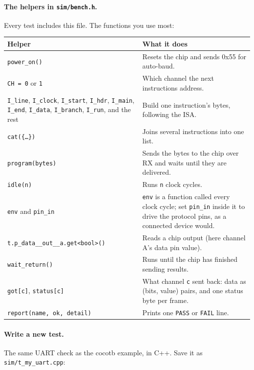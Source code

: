 \documentclass[11pt,a4paper]{article}
\newcommand{\file}[1]{\texttt{#1}}
\begin{document}
\paragraph{The helpers in \file{sim/bench.h}.} Every test includes this file. The functions you use most:

\begin{center}
\begin{tabularx}{\linewidth}{@{}>{\raggedright\arraybackslash}p{5.7cm}X@{}}
\toprule
Helper & What it does \\
\midrule
\texttt{power\_on()} & Resets the chip and sends 0x55 for auto-baud. \\
\texttt{CH = 0} or \texttt{1} & Which channel the next instructions address. \\
\texttt{I\_line}, \texttt{I\_clock}, \texttt{I\_start}, \texttt{I\_hdr}, \texttt{I\_main}, \texttt{I\_end}, \texttt{I\_data}, \texttt{I\_branch}, \texttt{I\_run}, and the rest & Build one instruction's bytes, following the ISA. \\
\texttt{cat(\{\ldots\})} & Joins several instructions into one list. \\
\texttt{program(bytes)} & Sends the bytes to the chip over RX and waits until they are delivered. \\
\texttt{idle(n)} & Runs \texttt{n} clock cycles. \\
\texttt{env} and \texttt{pin\_in} & \texttt{env} is a function called every clock cycle; set \texttt{pin\_in} inside it to drive the protocol pins, as a connected device would. \\
\texttt{t.p\_data\_\_out\_\_a.get<bool>()} & Reads a chip output (here channel A's data pin value). \\
\texttt{wait\_return()} & Runs until the chip has finished sending results. \\
\texttt{got[c]}, \texttt{status[c]} & What channel \texttt{c} sent back: data as (bits, value) pairs, and one status byte per frame. \\
\texttt{report(name, ok, detail)} & Prints one \texttt{PASS} or \texttt{FAIL} line. \\
\bottomrule
\end{tabularx}
\end{center}

\paragraph{Write a new test.} The same UART check as the cocotb example, in C++. Save it as \file{sim/t\_my\_uart.cpp}:
\end{document}
